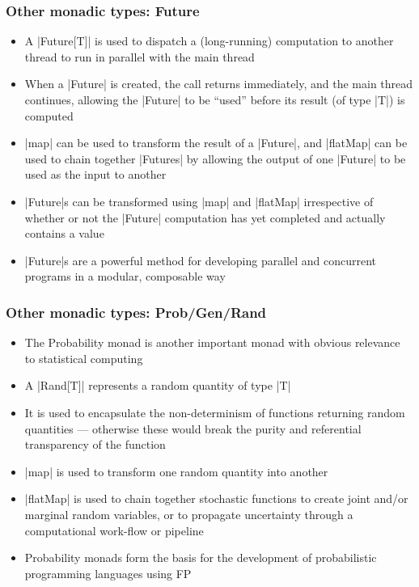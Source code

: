 \documentclass[mathserif,handout]{beamer}
\begin{document}
\begin{frame}[fragile]
  \frametitle{Other monadic types: Future}
  \begin{itemize}
  \item A |Future[T]| is used to dispatch a (long-running) computation to another thread to run in parallel with the main thread
  \item When a |Future| is created, the call returns immediately, and the main thread continues, allowing the |Future| to be ``used'' before its result (of type |T|) is computed
  \item |map| can be used to transform the result of a |Future|, and |flatMap| can be used to chain together |Futures| by allowing the output of one |Future| to be used as the input to another
  \item |Future|s can be transformed using |map| and |flatMap| irrespective of whether or not the |Future| computation has yet completed and actually contains a value
    \item |Future|s are a powerful method for developing parallel and concurrent programs in a modular, composable way
  \end{itemize}
\end{frame}

\begin{frame}[fragile]
  \frametitle{Other monadic types: Prob/Gen/Rand}
  \begin{itemize}
  \item The \alert{Probability monad} is another important monad with obvious relevance to statistical computing
  \item A |Rand[T]| represents a random quantity of type |T|
  \item It is used to encapsulate the non-determinism of functions returning random quantities --- otherwise these would break the \alert{purity} and \alert{referential transparency} of the function
  \item |map| is used to transform one random quantity into another
  \item |flatMap| is used to chain together stochastic functions to create joint and/or marginal random variables, or to \alert{propagate uncertainty} through a computational work-flow or pipeline
    \item Probability monads form the basis for the development of \alert{probabilistic programming languages} using FP
  \end{itemize}
\end{frame}
\end{document}
